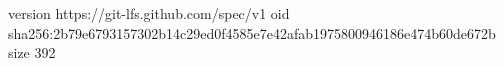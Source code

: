version https://git-lfs.github.com/spec/v1
oid sha256:2b79e6793157302b14c29ed0f4585e7e42afab1975800946186e474b60de672b
size 392
